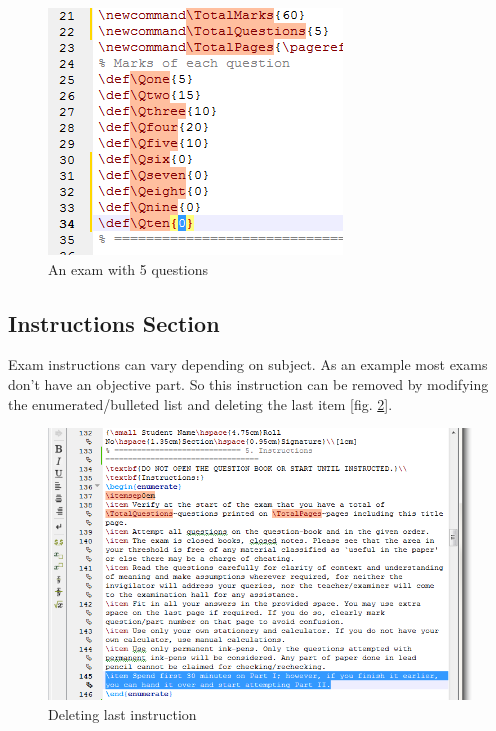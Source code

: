 \documentclass[12pt,a4paper]{article}
\begin{document}
\begin{figure}[H]
\centering
\includegraphics[scale=1.0]{ExamWith5Qs.png}
\caption{An exam with 5 questions}
\label{exam-with-5-qs}
\end{figure}
\subsection{Instructions Section}
Exam instructions can vary depending on subject. As an example most exams don't have an objective part. So this instruction can be removed by modifying the enumerated/bulleted list and deleting the last item [fig. \ref{exam-instructions}].
\begin{figure}[H]
\centering
\includegraphics[scale=0.85]{ExamInstructions.png}
\caption{Deleting last instruction}
\label{exam-instructions}
\end{figure}
\newpage
\end{document}
